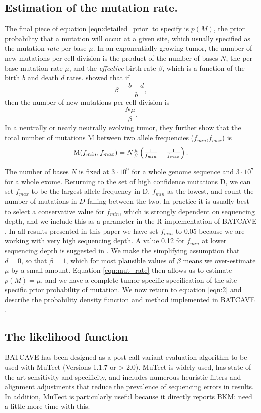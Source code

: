 \documentclass[a4,center,fleqn]{NAR}
\newcommand{\bkmcomment}[1]{{\color{blue}BKM: #1}}
\newcommand{\batcave}{BATCAVE }
\begin{document}
\subsection{Estimation of the mutation rate.}
The final piece of equation \ref{eqn:detailed_prior} to specify is $p(M)$, the prior probability that a mutation will occur at a given site, which usually specified as the mutation \textit{rate} per base $\mu$.
In an exponentially growing tumor, the number of new mutations per cell division is the product of the number of bases $N$, the per base mutation rate $\mu$, and the \textit{effective} birth rate $\beta$, which is a function of the birth $b$ and death $d$ rates.
\citet{Williams2016} showed that if 
$$
  \beta = \frac{b-d}{b},
$$
then the number of new mutations per cell division is
$$
  \frac{N \mu}{\beta}.
$$
In a neutrally or nearly neutrally evolving tumor, they further show that the total number of mutations $\mathrm{M}$ between two allele frequencies ($f_{min}$,$f_{max}$) is
\begin{equation}
  \label{eqn:mut_rate}
$$
  \mathrm{M}(f_{min},f_{max}) = N\frac{\mu}{\beta}\left(\frac{1}{f_{min}} - \frac{1}{f_{max}}\right).
$$
\end{equation}

The number of bases $N$ is fixed at $3\cdot10^9$ for a whole genome sequence and $3\cdot10^7$ for a whole exome.
Returning to the set of high confidence mutations $\mathrm{D}$, we can set $f_{max}$ to be the largest allele frequency in $\mathrm{D}$, $f_{min}$ as the lowest, and count the number of mutations in $D$ falling between the two.
In practice it is usually best to select a conservative value for $f_{min}$, which is strongly dependent on sequencing depth, and we include this as a parameter in the R implementation of \batcave.
In all results presented in this paper we have set $f_{min}$ to 0.05 because we are working with very high sequencing depth.
A value 0.12 for $f_{min}$ at lower sequencing depth is suggested in \citet{Williams2016}.
We make the simplifying assumption that $d = 0$, so that $\beta = 1$, which for most plausible values of $\beta$ means we over-estimate $\mu$ by a small amount.
Equation \ref{eqn:mut_rate} then allows us to estimate $p(M) = \mu$, and we have a complete tumor-specific specification of the site-specific prior probability of mutation.
We now return to equation \ref{eqn:2} and describe the probability density function and method implemented in \batcave.

\subsection{The likelihood function}
\batcave has been designed as a post-call variant evaluation algorithm to be used with MuTect (Versions 1.1.7 or > 2.0)\cite{Cibulskis2013}.
MuTect is widely used, has state of the art sensitivity and specificity, and includes numerous heuristic filters and alignment adjustments that reduce the prevalence of sequencing errors in results.
In addition, MuTect is particularly useful because it directly reports 
\bkmcomment{need a little more time with this.}
\end{document}
